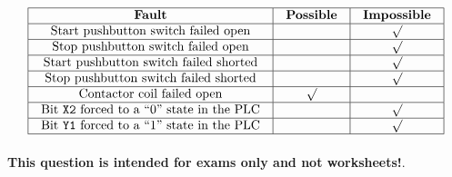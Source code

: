 






$$\vbox{\offinterlineskip
\halign{\strut
\vrule \quad\hfil # \ \hfil & 
\vrule \quad\hfil # \ \hfil & 
\vrule \quad\hfil # \ \hfil \vrule \cr
\noalign{\hrule}
%
{\bf Fault} & {\bf Possible} & {\bf Impossible} \cr
%
\noalign{\hrule}
%
Start pushbutton switch failed open &  & $\surd$ \cr
%
\noalign{\hrule}
%
Stop pushbutton switch failed open &  & $\surd$ \cr
%
\noalign{\hrule}
%
Start pushbutton switch failed shorted &  & $\surd$ \cr
%
\noalign{\hrule}
%
Stop pushbutton switch failed shorted &  & $\surd$ \cr
%
\noalign{\hrule}
%
Contactor coil failed open & $\surd$ &  \cr
%
\noalign{\hrule}
%
Bit {\tt X2} forced to a ``0'' state in the PLC &  & $\surd$ \cr
%
\noalign{\hrule}
%
Bit {\tt Y1} forced to a ``1'' state in the PLC &  & $\surd$ \cr
%
\noalign{\hrule}
} %
}$$ %








{\bf This question is intended for exams only and not worksheets!}.


